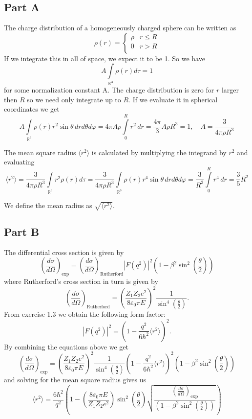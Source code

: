 \documentclass[a4paper, parskip=half, twopage]{scrartcl}
\begin{document}
\subsection*{Part A}
The charge distribution of a homogeneously charged sphere can be written as
\[
\rho(r) = \begin{cases}
\rho & r \leq R \\
0 & r > R \\
\end{cases}
\]
If we integrate this in all of space, we expect it to be 1. So we have
\[
A \int\limits_{\mathbb{R}^3} \rho(r) d\tau = 1
\]
for some normalization constant A. The charge distribution is zero for $r$ larger then $R$ so we need only integrate up to $R$. If we evaluate it in spherical coordinates we get
\[
A \int\limits_{\mathbb{R}^3} \rho(r) r^2 \sin \theta \, dr d\theta d\varphi = 4\pi A \rho \int\limits_{0}^{R} r^2 \, dr = \frac{4 \pi}{3} A \rho R^3 = 1, \quad A = \frac{3}{4 \pi \rho R^3} 
\]

The mean square radius $\langle r^2 \rangle$ is calculated by multiplying the integrand by $r^2$ and evaluating
\[
\langle r^2 \rangle = \frac{3}{4 \pi \rho R^3} \int\limits_{\mathbb{R}^3} r^2 \rho(r) d\tau = \frac{3}{4 \pi \rho R^3} \int\limits_{\mathbb{R}^3} \rho(r) r^4 \sin \theta \, dr d\theta d\varphi = \frac{3}{R^3} \int\limits_{0}^{R} r^4 \, dr = \frac{3}{5} R^2
\]

We define the mean radius as $\sqrt{\langle r^2 \rangle}$.

\subsection*{Part B}

The differential cross section is given by
\[
\left( \frac{d \sigma}{d \Omega} \right)_\text{exp} = \left( \frac{d \sigma}{d \Omega} \right)_\text{Rutherford} | F(q^2)|^2 \left( 1 - \beta^2 \sin^2\left( \frac{\theta}{2} \right) \right)
\]
where Rutherford's cross section in turn is given by
\[
\left( \frac{d \sigma}{d \Omega} \right)_\text{Rutherford} = \left( \frac{Z_1 Z_2 e^2}{8 \varepsilon_0 \pi E} \right)^2 \frac{1}{\sin^4 \left( \frac{\theta}{2} \right)}.
\]
From exercise 1.3 we obtain the following form factor:
\[
|F(q^2)|^2 = \left( 1-\frac{q^2}{6\hbar^2}\langle r^2 \rangle \right)^2 .
\]
By combining the equations above we get
\[
\left( \frac{d \sigma}{d \Omega} \right)_\text{exp} = \left( \frac{Z_1 Z_2 e^2}{8 \varepsilon_0 \pi E} \right)^2 \frac{1}{\sin^4 \left( \frac{\theta}{2} \right)} \left( 1-\frac{q^2}{6\hbar^2}\langle r^2 \rangle \right)^2 \left( 1 - \beta^2 \sin^2\left( \frac{\theta}{2} \right) \right)
\]
and solving for the mean square radius gives us
\[
\langle r^2 \rangle = \frac{6\hbar^2}{q^2} \left( 1 - \left( \frac{8\varepsilon_0\pi E}{Z_1 Z_2 e^2} \right) \sin^2 \left(\frac{\theta}{2} \right) \sqrt{ \frac{\left( \frac{d \sigma}{d \Omega} \right)_\text{exp}}{\left( 1 - \beta^2 \sin^2\left( \frac{\theta}{2} \right) \right)} } \right)
\]
\end{document}
